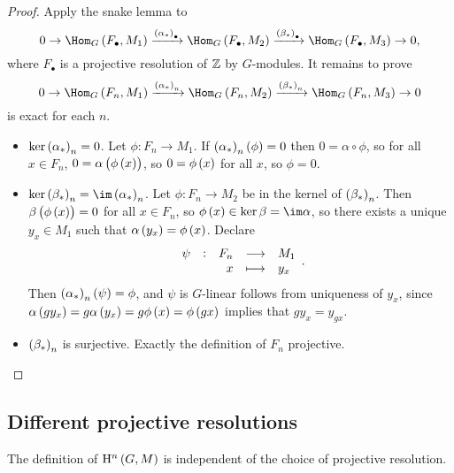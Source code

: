 \begin{proof}
Apply the snake lemma to
$$ 0 \to \Hom_G\br{F_\bullet, M_1} \xrightarrow{\br{\alpha_*}_\bullet} \Hom_G\br{F_\bullet, M_2} \xrightarrow{\br{\beta_*}_\bullet} \Hom_G\br{F_\bullet, M_3} \to 0, $$
where $ F_\bullet $ is a projective resolution of $ \mathbb{Z} $ by $ G $-modules. It remains to prove
$$ 0 \to \Hom_G\br{F_n, M_1} \xrightarrow{\br{\alpha_*}_n} \Hom_G\br{F_n, M_2} \xrightarrow{\br{\beta_*}_n} \Hom_G\br{F_n, M_3} \to 0 $$
is exact for each $ n $.
\begin{itemize}
\item $ \ker \br{\alpha_*}_n = 0 $. Let $ \phi : F_n \to M_1 $. If $ \br{\alpha_*}_n\br{\phi} = 0 $ then $ 0 = \alpha \circ \phi $, so for all $ x \in F_n $, $ 0 = \alpha\br{\phi\br{x}} $, so $ 0 = \phi\br{x} $ for all $ x $, so $ \phi = 0 $.
\item $ \ker \br{\beta_*}_n = \im \br{\alpha_*}_n $. Let $ \phi : F_n \to M_2 $ be in the kernel of $ \br{\beta_*}_n $. Then $ \beta\br{\phi\br{x}} = 0 $ for all $ x \in F_n $, so $ \phi\br{x} \in \ker \beta = \im \alpha $, so there exists a unique $ y_x \in M_1 $ such that $ \alpha\br{y_x} = \phi\br{x} $. Declare
$$ \function[\psi]{F_n}{M_1}{x}{y_x}. $$
Then $ \br{\alpha_*}_n\br{\psi} = \phi $, and $ \psi $ is $ G $-linear follows from uniqueness of $ y_x $, since $ \alpha\br{gy_x} = g\alpha\br{y_x} = g\phi\br{x} = \phi\br{gx} $ implies that $ gy_x = y_{gx} $.
\item $ \br{\beta_*}_n $ is surjective. Exactly the definition of $ F_n $ projective.
\end{itemize}
\end{proof}

\subsection{Different projective resolutions}

\begin{theorem}
\label{thm:5.2.1}
The definition of $ \H^n\br{G, M} $ is independent of the choice of projective resolution.
\end{theorem}

